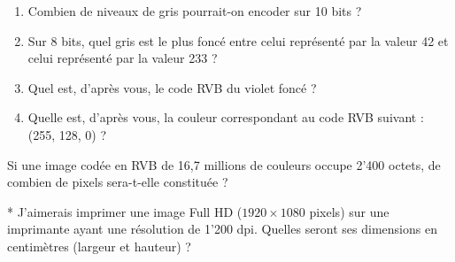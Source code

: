 \documentclass[11pt, a4paper]{book}
\begin{document}
\begin{exercice}
\begin{enumerate}
    \item Combien de niveaux de gris pourrait-on encoder sur 10 bits ?
    
    \item Sur 8 bits, quel gris est le plus foncé entre celui représenté par la valeur 42 et celui représenté par la valeur 233 ? 

    \item Quel est, d'après vous, le code RVB du violet foncé ? %

    \item Quelle est, d'après vous, la couleur correspondant au code RVB suivant : (255, 128, 0) ? %
\end{enumerate}
\end{exercice}

\begin{exercice}
Si une image codée en RVB de 16,7 millions de couleurs occupe 2'400 octets, de combien de pixels sera-t-elle constituée ?
\end{exercice}


\begin{exercice}
* J’aimerais imprimer une image Full HD ($1920 \times 1080$ pixels) sur une imprimante ayant une résolution de 1'200 dpi. 
Quelles seront ses dimensions en centimètres (largeur et hauteur) ?

\end{exercice}
\end{document}

